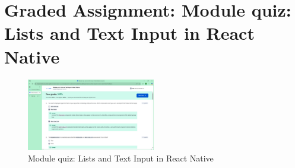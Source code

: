 \section{Graded Assignment: Module quiz: Lists and Text Input in React Native}
\begin{figure}[H]
    \centering
    \includegraphics[width=0.5\textwidth]{images/module-quiz.png}
    \caption{Module quiz: Lists and Text Input in React Native}
\end{figure}